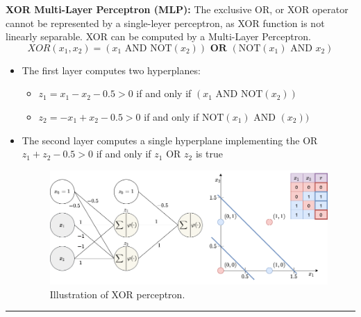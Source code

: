\documentclass[12pt, a4paper]{article}
\begin{document}
\textbf{XOR Multi-Layer Perceptron (MLP):} The exclusive OR, or XOR operator cannot be represented by a single-leyer perceptron, as XOR function is not linearly separable. XOR can be computed by a Multi-Layer Perceptron.
$$
XOR(x_1,x_2) = (x_1 \text{ AND NOT}(x_2)) \textbf{ OR } (\text{NOT}(x_1) \text{ AND } x_2)
$$
\begin{itemize}
  \item The first layer computes two hyperplanes:
  \begin{itemize}
    \item $z_1 = x_1 - x_2 - 0.5 > 0$ if and only if $(x_1 \text{ AND NOT}(x_2))$
    \item $z_2 = -x_1 + x_2 - 0.5 > 0$ if and only if $\text{NOT}(x_1) \text{ AND }(x_2))$
  \end{itemize}
  \item The second layer computes a single hyperplane implementing the OR $z_1 + z_2 - 0.5 > 0$ if and only if $z_1$ OR $z_2$ is true
  \begin{figure}[H]
    \centering
      \includegraphics[width=0.9\columnwidth]{images/xor-perceptron.png}
      \caption{Illustration of XOR perceptron.}
      \label{fig:xor-perceptron}
  \end{figure}
\end{itemize}







\begin{center}\rule{3in}{0.4pt}\end{center}






















  \newpage
\end{document}
